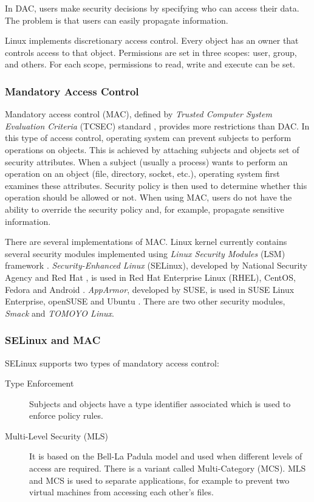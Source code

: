 In DAC, users make security decisions by specifying who can access their data.
The problem is that users can easily propagate information.

Linux implements discretionary access control. Every object has an owner that
controls access to that object. Permissions are set in three scopes: user,
group, and others. For each scope, permissions to read, write and execute can be
set.

\subsubsection{Mandatory Access Control}
Mandatory access control (MAC), defined by \emph{Trusted Computer System
Evaluation Criteria} (TCSEC) standard \cite{orangebook}, provides more
restrictions than DAC. In this type of access control, operating system can
prevent subjects to perform operations on objects. This is achieved by attaching
subjects and objects set of security attributes. When a subject (usually a
process) wants to perform an operation on an object (file, directory, socket,
etc.), operating system first examines these attributes. Security policy is then
used to determine whether this operation should be allowed or not. When using
MAC, users do not have the ability to override the security policy and, for
example, propagate sensitive information.

There are several implementations of MAC. Linux kernel currently contains
several security modules implemented using \emph{Linux Security Modules} (LSM)
framework \cite{lsmusage}. \emph{Security-Enhanced Linux} (SELinux), developed
by National Security Agency and Red Hat \cite{selinuxcontr}, is used in Red Hat
Enterprise Linux (RHEL), CentOS, Fedora and Android
\cite{selinuxguide,selinuxguidefedora,selinuxandroid}. \emph{AppArmor},
developed by SUSE, is used in SUSE Linux Enterprise, openSUSE and Ubuntu
\cite{apparmor,apparmorubuntu}. There are two other security modules,
\emph{Smack} and \emph{TOMOYO Linux}.

\subsubsection{SELinux and MAC}
SELinux supports two types of mandatory access control:
\begin{description}
    \item [Type Enforcement] Subjects and objects have a type identifier
        associated which is used to enforce policy rules.
    \item [Multi-Level Security (MLS)] It is based on the Bell-La Padula model
        and used when different levels of access are required. There is a
        variant called Multi-Category (MCS). MLS and MCS is used to separate
        applications, for example to prevent two virtual machines from accessing
        each other's files.
\end{description}


